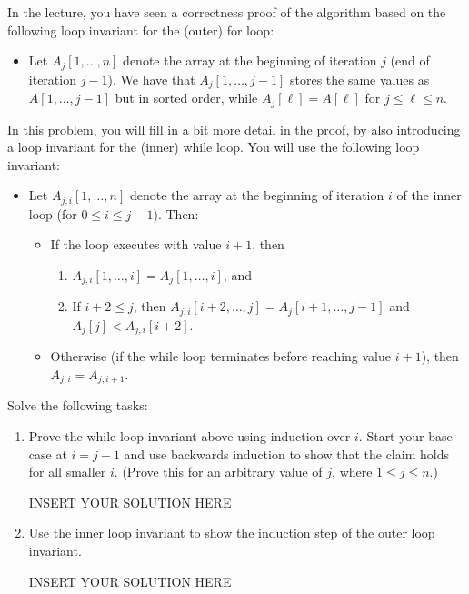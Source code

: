\noindent
In the lecture, you have seen a correctness proof of the algorithm based on the following loop invariant for the (outer) for loop:
\begin{itemize}
	\item Let $A_j[1,\ldots,n]$ denote the array at the beginning of iteration $j$ (end of iteration $j-1$). We have that $A_j[1,\ldots,j-1]$ stores the same values as $A[1,\ldots,j-1]$ but in sorted order, while $A_j[\ell] = A[\ell]$ for $j \leq \ell \leq n$. 
\end{itemize}
In this problem, you will fill in a bit more detail in the proof, by also introducing a loop invariant for the (inner) while loop. You will use the following loop invariant:
\begin{itemize}
	\item Let $A_{j,i}[1,\ldots,n]$ denote the array at the beginning of iteration $i$ of the inner loop (for $0 \leq i \leq j-1$). 
    Then:
    \begin{itemize}
        \item If the loop executes with value $i+ 1$, then 
        \begin{enumerate}[nosep]
		\item $A_{j,i}[1,\ldots,i] = A_j[1,\ldots,i]$, and
		\item If $i+2 \leq j$, then $A_{j,i}[i+2,\ldots,j] = A_j[i+1,\ldots,j-1]$ and $A_j[j] < A_{j,i}[i+2]$.
	\end{enumerate}
 \item Otherwise (if the while loop terminates before reaching value $i + 1$), then $A_{j,i} = A_{j,i+1}$.
    \end{itemize}

\end{itemize}

Solve the following tasks:
\begin{enumerate}
	\item Prove the while loop invariant above using induction over $i$. Start your base case at $i=j-1$ and use backwards induction to show that the claim holds for all smaller $i$. (Prove this for an arbitrary value of $j$,
 where $1 \leq j \leq n$.)
	
\begin{solution}   INSERT YOUR SOLUTION HERE   \end{solution}
	
	\item Use the inner loop invariant to show the induction step of the outer loop invariant.
	
\begin{solution}   INSERT YOUR SOLUTION HERE   \end{solution}
	
\end{enumerate}

